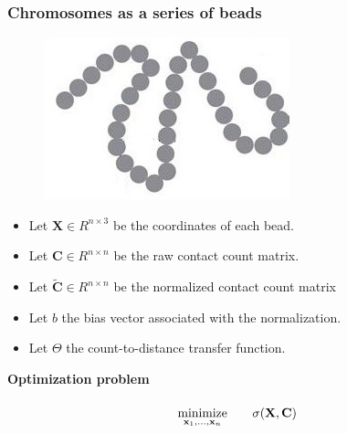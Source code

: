 \documentclass[xcolor=dvipsnames]{beamer}
\begin{document}
\begin{frame}
\frametitle{Chromosomes as a series of beads}

\begin{figure}
\includegraphics[width=0.25\linewidth]{figures/chrom_as_series_beads.jpg}
\end{figure}

\begin{itemize}[label={$\bullet$}]

\item Let $\mathbf{X} \in R^{n \times 3}$ be the coordinates of each bead.
\item Let $\mathbf{C} \in R^{n \times n}$ be the raw contact count matrix.
\item Let $\mathbf{\tilde{C}} \in R^{n \times n}$ be the normalized contact count
matrix
\item Let $b$ the bias vector associated with the normalization.
\item Let $\Theta$ the count-to-distance transfer function.
\end{itemize}

\vspace{2em}
{\color{Blue} \bf Optimization problem}
\begin{equation*}
\renewcommand{\arraystretch}{2}
\begin{array}{ccll}
\underset{{\bf x}_1,\ldots,{\bf x}_n}{\text{minimize}} & &
\sigma(\mathbf{X}, \mathbf{C})\\
\end{array}
\end{equation*}
\end{frame}
\end{document}
